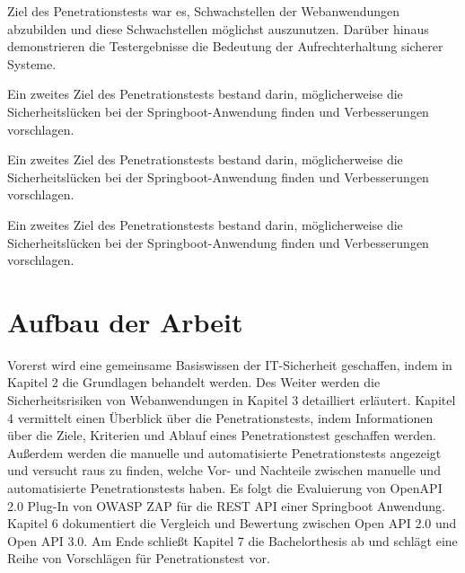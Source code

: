 Ziel des Penetrationstests war es, Schwachstellen der Webanwendungen abzubilden und diese Schwachstellen möglichst auszunutzen. Darüber hinaus demonstrieren die Testergebnisse die Bedeutung der Aufrechterhaltung sicherer Systeme.

Ein zweites Ziel des Penetrationstests bestand darin, möglicherweise die Sicherheitslücken bei der Springboot-Anwendung finden und Verbesserungen vorschlagen.

Ein zweites Ziel des Penetrationstests bestand darin, möglicherweise die Sicherheitslücken bei der Springboot-Anwendung finden und Verbesserungen vorschlagen.

Ein zweites Ziel des Penetrationstests bestand darin, möglicherweise die Sicherheitslücken bei der Springboot-Anwendung finden und Verbesserungen vorschlagen.

\section{Aufbau der Arbeit}

Vorerst wird eine gemeinsame Basiswissen der IT-Sicherheit geschaffen, indem in Kapitel 2 die Grundlagen behandelt werden. Des Weiter werden die Sicherheitsrisiken von Webanwendungen in Kapitel 3  detailliert erläutert. Kapitel 4 vermittelt einen Überblick über die Penetrationstests, indem Informationen über die Ziele, Kriterien und Ablauf eines Penetrationstest geschaffen werden. Außerdem werden die manuelle und automatisierte Penetrationstests angezeigt und versucht raus zu finden, welche Vor- und Nachteile zwischen manuelle und automatisierte Penetrationstests haben. Es folgt die Evaluierung von OpenAPI 2.0 Plug-In von OWASP ZAP für die REST API einer Springboot Anwendung. Kapitel 6 dokumentiert die Vergleich und Bewertung zwischen Open API 2.0 und Open API 3.0. Am Ende schließt Kapitel 7 die Bachelorthesis ab und schlägt eine Reihe von Vorschlägen für Penetrationstest vor.

